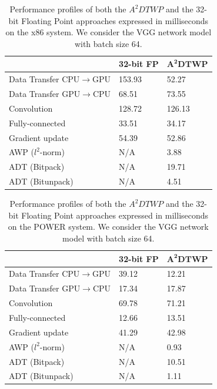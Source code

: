 \begin{table}
    \caption{Performance profiles of both the $A^2DTWP$ and the 32-bit Floating 
    Point approaches expressed in milliseconds on the x86 system. 
    We consider the VGG network model with batch size 64.} 
    \centering
    \begin{tabular}{|P{4.5cm}|P{2.5cm}|P{2.5cm}|}
    \hline
    & \textbf{32-bit FP} & $\mathbf{A^2DTWP}$\\
    \hline
    Data Transfer CPU$\rightarrow$GPU& 153.93 & 52.27 \\
    \hline
    Data Transfer GPU$\rightarrow$CPU& 68.51 & 73.55 \\
    \hline
    Convolution & 128.72 & 126.13\\
    \hline
    Fully-connected & 33.51 & 34.17 \\
    \hline
    Gradient update & 54.39 & 52.86\\
    \hline
    AWP ($l^2$-norm) & N/A & 3.88 \\
    \hline
    ADT (Bitpack) & N/A & 19.71 \\
    \hline
    ADT (Bitunpack) & N/A & 4.51 \\
    \hline
    \end{tabular}
    \label{table:performance}
\end{table}

\begin{table}
    \caption{Performance profiles of both the $A^2DTWP$ and the 32-bit Floating 
    Point approaches expressed in milliseconds on the POWER system. 
    We consider the VGG network model with batch size 64.} 
    \centering
    \begin{tabular}{|P{4.5cm}|P{2.5cm}|P{2.5cm}|}
    \hline
    & \textbf{32-bit FP} & $\mathbf{A^2DTWP}$ \\
    \hline
    Data Transfer CPU$\rightarrow$GPU& 39.12 & 12.21 \\
    \hline
    Data Transfer GPU$\rightarrow$CPU& 17.34 & 17.87 \\
    \hline
    Convolution & 69.78 & 71.21\\
    \hline
    Fully-connected & 12.66 & 13.51 \\
    \hline
    Gradient update & 41.29 & 42.98\\
    \hline
    AWP ($l^2$-norm) & N/A & 0.93 \\
    \hline
    ADT (Bitpack) & N/A & 10.51 \\
    \hline
    ADT (Bitunpack) & N/A & 1.11 \\
    \hline
    \end{tabular}
    \label{table:performance_p9}
\end{table}

